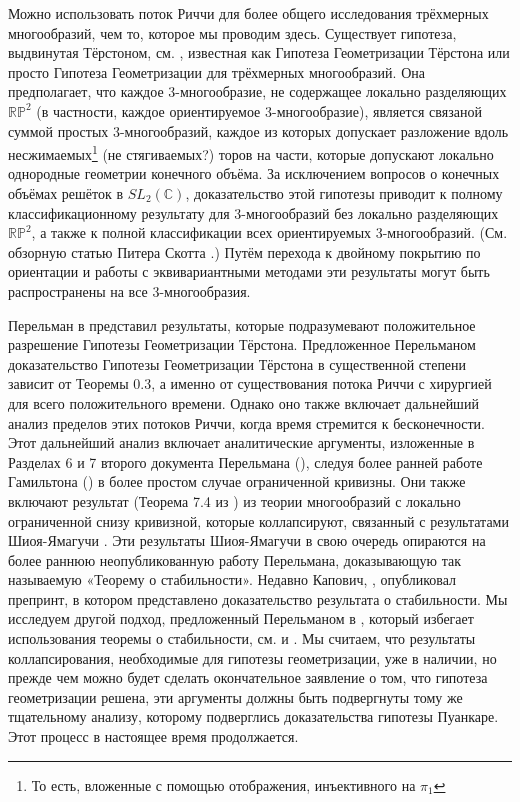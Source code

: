 Можно использовать поток Риччи для более общего исследования трёхмерных многообразий, 
чем то, которое мы проводим здесь. Существует гипотеза, выдвинутая Тёрстоном, см. \cite{c69}, 
известная как Гипотеза Геометризации Тёрстона или просто Гипотеза Геометризации для 
трёхмерных многообразий. Она предполагает, что каждое 3-многообразие, не содержащее 
локально разделяющих $\mathbb{RP}^2$ (в частности, каждое ориентируемое 3-многообразие), является 
связаной суммой простых 3-многообразий, каждое из которых допускает разложение 
вдоль несжимаемых\footnote{То есть, вложенные с помощью отображения, инъективного на $\pi_{1}$} 
(не стягиваемых?) торов на части, которые допускают локально однородные геометрии 
конечного объёма. За исключением вопросов о конечных объёмах решёток в $SL_{2}(\mathbb{C})$, 
доказательство этой гипотезы приводит к полному классификационному результату для 
3-многообразий без локально разделяющих $\mathbb{RP}^2$, а также к полной классификации всех 
ориентируемых 3-многообразий. (См. обзорную статью Питера Скотта \cite{c63}.) 
Путём перехода к двойному покрытию по ориентации и работы с эквивариантными 
методами эти результаты могут быть распространены на все 3-многообразия.

Перельман в \cite{c55} представил результаты, которые подразумевают положительное разрешение 
Гипотезы Геометризации Тёрстона. Предложенное Перельманом доказательство Гипотезы 
Геометризации Тёрстона в существенной степени зависит от Теоремы 0.3, а именно от 
существования потока Риччи с хирургией для всего положительного времени. Однако оно 
также включает дальнейший анализ пределов этих потоков Риччи, когда время стремится 
к бесконечности. Этот дальнейший анализ включает аналитические аргументы, изложенные 
в Разделах 6 и 7 второго документа Перельмана (\cite{c55}), следуя более ранней работе 
Гамильтона (\cite{c36}) в более простом случае ограниченной кривизны. Они также включают 
результат (Теорема 7.4 из \cite{c55}) из теории многообразий с локально ограниченной снизу 
кривизной, которые коллапсируют, связанный с результатами Шиоя-Ямагучи \cite{c67}. Эти 
результаты Шиоя-Ямагучи в свою очередь опираются на более раннюю неопубликованную 
работу Перельмана, доказывающую так называемую «Теорему о стабильности». Недавно 
Капович, \cite{c43}, опубликовал препринт, в котором представлено доказательство результата 
о стабильности. Мы исследуем другой подход, предложенный Перельманом в \cite{c55}, который 
избегает использования теоремы о стабильности, см. \cite{c44} и \cite{c51}. Мы считаем, что 
результаты коллапсирования, необходимые для гипотезы геометризации, уже в наличии, 
но прежде чем можно будет сделать окончательное заявление о том, что гипотеза 
геометризации решена, эти аргументы должны быть подвергнуты тому же тщательному 
анализу, которому подверглись доказательства гипотезы Пуанкаре. Этот процесс в 
настоящее время продолжается.

